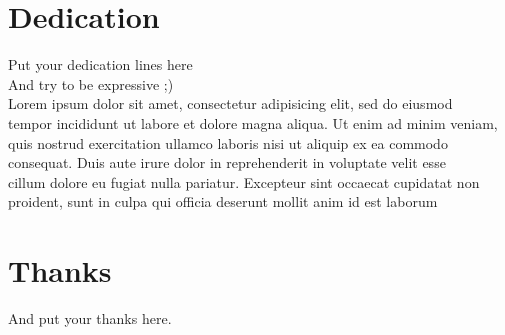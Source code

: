 \documentclass[a4paper, oneside]{report}
\newcommand{\reportAuthor} {%
  FirstName \textsc{LastName}%
}
\begin{document}
\chapter*{Dedication}
\thispagestyle{empty}
%

\begin{center}
  Put your dedication lines here ~\\
  And try to be expressive ;) ~\\


  Lorem ipsum dolor sit amet, consectetur adipisicing elit, sed do eiusmod ~\\
  tempor incididunt ut labore et dolore magna aliqua. Ut enim ad minim veniam, ~\\
  quis nostrud exercitation ullamco laboris nisi ut aliquip ex ea commodo ~\\
  consequat. Duis aute irure dolor in reprehenderit in voluptate velit esse ~\\
  cillum dolore eu fugiat nulla pariatur. Excepteur sint occaecat cupidatat non ~\\
  proident, sunt in culpa qui officia deserunt mollit anim id est laborum ~\\
\end{center}
%
%

\chapter*{Thanks}
\thispagestyle{empty}

And put your thanks here. \\
\end{document}
